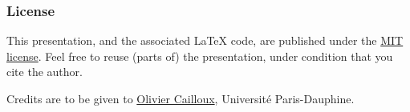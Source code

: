 \documentclass[english, french]{beamer}
\begin{document}
\appendix
\makeatletter
\def\insertframenumber{\@roman\c@framenumber}
\def\inserttotalframenumber{\@roman\c@framenumber}
\makeatother

\clearpage{}
\begin{frame}[plain]
	\frametitle{License}
	This presentation, and the associated \LaTeX{} code, are published under the \href{https://opensource.org/licenses/MIT}{MIT license}. Feel free to reuse (parts of) the presentation, under condition that you cite the author.
	
	Credits are to be given to \href{https://www.lamsade.dauphine.fr/~ocailloux/}{Olivier Cailloux}, Université Paris-Dauphine.
\end{frame}
\addtocounter{framenumber}{-1}
\end{document}
